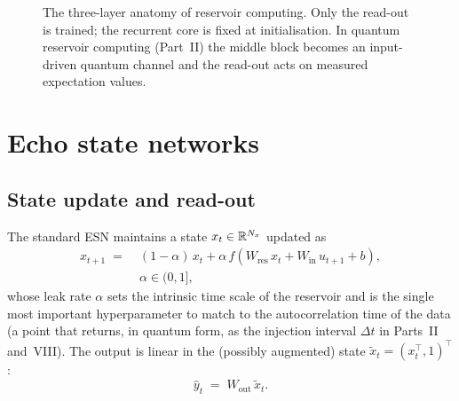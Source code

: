 \begin{figure}[t]
\centering
{}
\caption{The three-layer anatomy of reservoir computing. Only the read-out is
trained; the recurrent core is fixed at initialisation. In quantum reservoir
computing (Part~II) the middle block becomes an input-driven quantum channel
and the read-out acts on measured expectation values.}
\label{fig:rc-blocks}
\end{figure}

\section{Echo state networks}
\label{sec:esn}

\subsection{State update and read-out}

The standard ESN maintains a state $x_t \in \mathbb{R}^{N_x}$ updated as
\begin{equation}
\begin{aligned}
  x_{t+1} \;=\;{}& (1-\alpha)\, x_t
  + \alpha\, f\!\left(W_{\mathrm{res}}\, x_t + W_{\mathrm{in}}\, u_{t+1} + b\right),\\
  & \alpha \in (0,1],
\end{aligned}
  \label{eq:leaky}
\end{equation}
whose leak rate $\alpha$ sets the intrinsic time scale of the reservoir and is
the single most important hyperparameter to match to the autocorrelation time
of the data (a point that returns, in quantum form, as the injection interval
$\Delta t$ in Parts~II and~VIII). The output is linear in the (possibly
augmented) state $\tilde x_t = (x_t^{\!\top}, 1)^{\!\top}$:
\begin{equation}
  \hat y_t \;=\; W_{\mathrm{out}}\, \tilde x_t .
  \label{eq:readout}
\end{equation}

